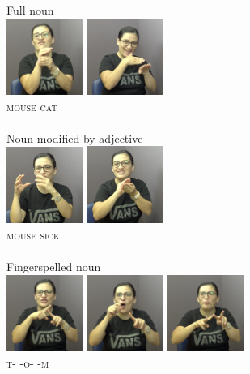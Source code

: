 \documentclass[
  english,
  doc,mask]{apa6}
\begin{document}
\begin{multicols}{2}
\begin{exe}
\ex
\begin{xlist}
\ex Full noun \\\glll
\includegraphics[width=2.5cm]{pictures/1a_1.png} \includegraphics[width=2.5cm]{pictures/1a_2.png} \\ \textsc{mouse} \textsc{cat} \\ \\ 
\ex Noun modified by adjective \\\glll
\includegraphics[width=2.5cm]{pictures/1c_1.png} \includegraphics[width=2.5cm]{pictures/1c_2.png} \\ \textsc{mouse} \textsc{sick} \\ \\ 
\ex Fingerspelled noun\\\glll 
\includegraphics[width=2.5cm]{pictures/1b_1.png} \includegraphics[width=2.5cm]{pictures/1b_2.png} \includegraphics[width=2.5cm]{pictures/1b_3.png}\\ \textsc{t-} \textsc{-o-} \textsc{-m} \\ \\

\end{xlist}
\end{exe}
\end{multicols}
\end{document}
